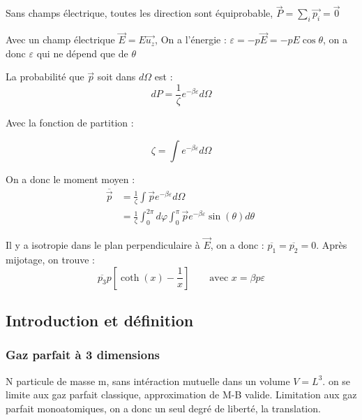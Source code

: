 \documentclass[12pt,a4paper]{report}
\begin{document}
Sans champs électrique, toutes les direction sont équiprobable, \( \vec{P} = \sum_i \vec{p_i} = \vec{0} \)

Avec un champ électrique \( \vec{E} = E \vec{u_z} \), On a l'énergie : \( \varepsilon= - p \vec{E} = -p E \cos\theta \), on a donc \( \varepsilon \) qui ne dépend que de \( \theta \)

La probabilité que \( \vec{p} \) soit dans \( d\Omega \) est :
\[
	dP = \frac{1}{\zeta} e^{-\beta \varepsilon} d\Omega
\]

Avec la fonction de partition :

\[
	\zeta = \int e^{-\beta \varepsilon} d \Omega
\]

On a donc le moment moyen :
\begin{align*}
	\overline{\vec{p}} &= \frac{1}{\zeta} \int \vec{p} e^{-\beta \varepsilon} d\Omega\\
	&= \frac{1}{\zeta} \int_0^{2\pi} d\varphi \int_0^\pi \vec{p} e^{-\beta \varepsilon} \sin(\theta) d\theta\
\end{align*}

Il y a isotropie dans le plan perpendiculaire à \( \vec{E} \), on a donc : \( \overline{p_1} = \overline{p_2} = 0 \). Après mijotage, on trouve :
\[
	\overline{p_3} p \left [ \coth (x) - \frac{1}{x} \right ] \qquad \text{avec } x = \beta p \varepsilon
\]

\subsection{Introduction et définition}

\subsubsection{Gaz parfait à 3 dimensions}

N particule de masse m, sans intéraction mutuelle dans un volume \( V = L^3\). on se limite aux gaz parfait classique, approximation de M-B valide. Limitation aux gaz parfait monoatomiques, on a donc un seul degré de liberté, la translation.
\end{document}
